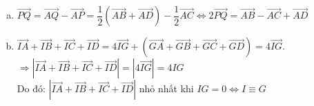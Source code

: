 \begin{ex}
{\begin{enumerate}[a)]
			      Vì $G$ là trung điểm của $MN$ nên $\vec{GM}+\vec{GN}=\vec{0}$\\
			      Do đó: $\vec{GA}+\vec{GB}+\vec{GC}+\vec{GD}=2\left(\vec{GM}+\vec{GN}\right)=2 \cdot \vec{0}=\vec{0}$.
			\item $\vec{PQ}=\vec{AQ}-\vec{AP}=\dfrac{1}{2}\left(\vec{AB}+\vec{AD}\right)-\dfrac{1}{2}\vec{AC}\Leftrightarrow 2\vec{PQ}=\vec{AB}-\vec{AC}+\vec{AD}$
			\item $\vec{IA}+\vec{IB}+\vec{IC}+\vec{ID}=4\vec{IG}+\left(\vec{GA}+\vec{GB}+\vec{GC}+\vec{GD}\right)=4\vec{IG}$.\\
			      $\Rightarrow | \vec{IA}+\vec{IB}+\vec{IC}+\vec{ID}|=| 4\vec{IG}|=4IG$\\
			      Do đó: $| \vec{IA}+\vec{IB}+\vec{IC}+\vec{ID}|$ nhỏ nhất khi $IG=0\Leftrightarrow I\equiv G$
		\end{enumerate}
	}
\end{ex}
